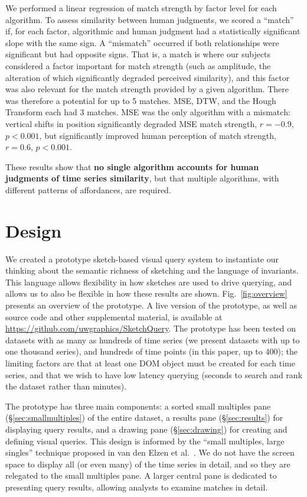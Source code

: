We performed a linear regression of match strength by factor level for each algorithm. To assess similarity between human judgments, we scored a ``match'' if, for each factor, algorithmic and human judgment had a statistically significant slope with the same sign. A ``mismatch'' occurred if both relationships were significant but had opposite signs. That is, a match is where our subjects considered a factor important for match strength (such as amplitude, the alteration of which significantly degraded perceived similarity), and this factor was also relevant for the match strength provided by a given algorithm. There was therefore a potential for up to 5 matches. MSE, DTW, and the Hough Transform each had 3 matches. MSE was the only algorithm with a mismatch:  vertical shifts in position significantly degraded MSE match strength, $r=-0.9$, $p<0.001$, but significantly improved human perception of match strength, $r=0.6$, $p<0.001$.

These results show that \textbf{no single algorithm accounts for human judgments of time series similarity}, but that multiple algorithms, with different patterns of affordances, are required.

\section{Design}

We created a prototype sketch-based visual query system to instantiate our thinking about the semantic richness of sketching and the language of invariants. This language allows flexibility in how sketches are used to drive querying, and allows us to also be flexible in how these results are shown. Fig.~\ref{fig:overview} presents an overview of the prototype. A live version of the prototype, as well as source code and other supplemental material, is available at \url{https://github.com/uwgraphics/SketchQuery}. The prototype has been tested on datasets with as many as hundreds of time series (we present datasets with up to one thousand series), and hundreds of time points (in this paper, up to 400); the limiting factors are that at least one DOM object must be created for each time series, and that we wish to have low latency querying (seconds to search and rank the dataset rather than minutes).

The prototype has three main components: a sorted small multiples pane (\S\ref{sec:smallmultiples}) of the entire dataset, a results pane (\S\ref{sec:results}) for displaying query results, and a drawing pane (\S\ref{sec:drawing}) for creating and defining visual queries.  This design is informed by the ``small multiples, large singles'' technique proposed in van den Elzen et al.~\cite{van2013small}. We do not have the screen space to display all (or even many) of the time series in detail, and so they are relegated to the small multiples pane. A larger central pane is dedicated to presenting query results, allowing analysts to examine matches in detail.

